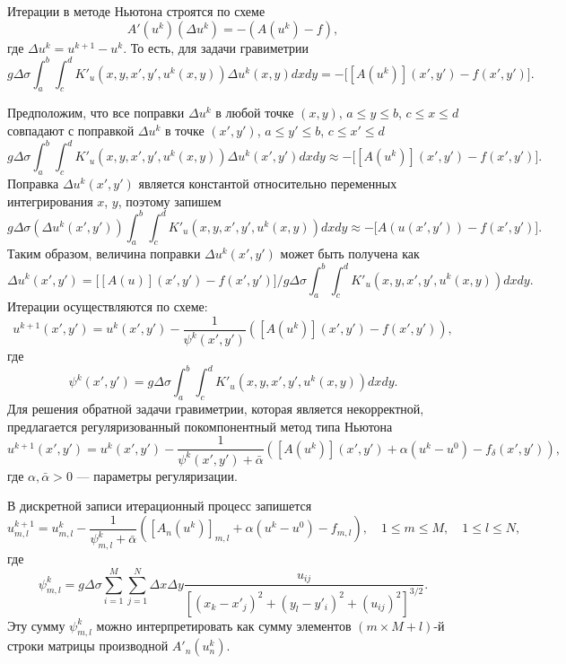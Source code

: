 Итерации в методе Ньютона строятся по схеме
$$A'(u^k)(\Delta u^k)=-(A(u^k)-f),$$ где $\Delta u^k=u^{k+1}-u^k$.
То есть, для задачи гравиметрии
\begin{equation}\label{equ_grav_nwt}
g\Delta\sigma\int_{a}^{b}\int_{c}^{d}K'_u(x,y, x',y',u^k(x,y))\Delta u^k(x,y) dxdy=-\big[[A(u^k)](x',y')-f(x',y')\big].
\end{equation}

Предположим, что все поправки  $\Delta u^k$ в любой точке $(x,y)$, $a\le y\le b$, $c\le x\le d$ совпадают с поправкой $\Delta u^k$ в точке $(x',y')$, $a\le y'\le b$, $c\le x'\le d$ 
$$g\Delta\sigma\int_{a}^{b}\int_{c}^{d}K'_u(x,y, x',y',u^k(x,y))\Delta u^k(x',y') dxdy\approx-\big[[A(u^k)](x',y')-f(x',y')\big].$$
Поправка $\Delta u^k(x',y')$ является константой относительно переменных интегрирования $x$, $y$, поэтому запишем
\begin{equation}\label{comp_newt_meth_step1}
g\Delta\sigma(\Delta u^k(x',y'))\int_{a}^{b}\int_{c}^{d}K'_u(x,y, x',y',u^k(x,y)) dxdy\approx -\big[A(u(x',y'))-f(x',y')\big].
\end{equation}
Таким образом, величина поправки $\Delta u^k(x',y')$ может быть получена как
$$\Delta u^k(x',y')=\bigg[[A(u)](x',y')-f(x',y')\bigg]\bigg/g\Delta\sigma\int_{a}^{b}\int_{c}^{d}K'_u(x,y, x',y',u^k(x,y)) dxdy.$$ 
Итерации осуществляются по схеме:
\begin{equation}\label{comp_newt_meth}
u^{k+1}(x',y')=u^k(x',y')-\frac{1}{\psi^k(x',y')}([A(u^k)](x',y')-f(x',y')),
\end{equation}
где $$\psi^k(x',y')=g\Delta\sigma\int_{a}^{b}\int_{c}^{d}K'_u(x,y, x',y',u^k(x,y)) dxdy.$$
Для решения обратной задачи гравиметрии, которая является некорректной, предлагается регуляризованный покомпонентный метод типа Ньютона
\begin{equation}\label{rcomp_newt_meth}
u^{k+1}(x',y')=u^k(x',y')-\frac{1}{\psi^k(x',y')+\bar\alpha}([A(u^k)](x',y') + \alpha(u^k-u^0)-f_\delta(x',y')),
\end{equation}
где $\alpha, \bar{\alpha} > 0$ --- параметры регуляризации.

В дискретной записи итерационный процесс запишется
$$u_{m,l}^{k+1}=u_{m,l}^k-\frac{1}{\psi_{m,l}^k+\bar\alpha}([A_n(u^k)]_{m,l} + \alpha(u^k-u^0) -f_{m,l}),\quad 1\le m \le M, \quad 1\le l \le N,$$
где $$\psi_{m,l}^k=g\Delta\sigma\sum\limits_{i=1}^{M}\sum\limits_{j=1}^{N}
\Delta x\Delta y\frac{u_{ij}}{[(x_k-x'_j)^2+(y_l-y'_i)^2+(u_{ij})^2]^{3/2}}.$$
Эту сумму $\psi_{m,l}^k$ можно интерпретировать как сумму элементов $(m\times M + l)$-й строки матрицы производной $A'_n(u_n^k)$.

